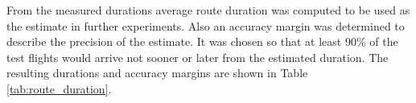 From the measured durations average route duration was computed to be used as the estimate in further experiments. Also an accuracy margin was determined to describe the precision of the estimate. It was chosen so that at least 90\% of the test flights would arrive not sooner or later from the estimated duration. The resulting durations and accuracy margins are shown in Table \ref{tab:route_duration}.